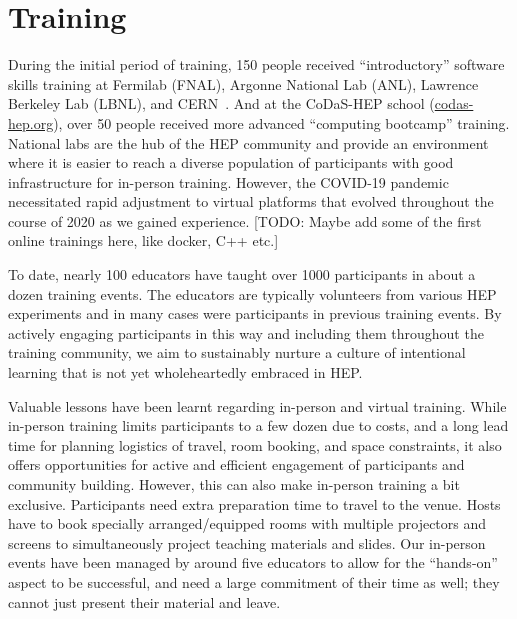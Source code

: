 \documentclass[twocolumn]{svjour3}          %
\begin{document}
\section{Training}\label{sec:Training}

During the initial period of training, 150 people received \enquote{introductory} software skills training at Fermilab (FNAL), Argonne National Lab (ANL), Lawrence Berkeley Lab (LBNL), and CERN~\cite{HSF-training-SC-FNAL-2019,HSF-training-ATLAS-ANL-2019,HSF-training-ATLAS-LBNL-2019,HSF-training-SC-CERN-2019}. And at the CoDaS-HEP school (\href{http://codas-hep.org/}{codas-hep.org}), over 50 people received more advanced ``computing bootcamp'' training. National labs are the hub of the HEP community and provide an environment where it is easier to reach a diverse population of participants with good infrastructure for in-person training.  However, the COVID-19 pandemic necessitated rapid adjustment to virtual platforms that evolved throughout the course of 2020 as we gained experience. [TODO: Maybe add some of the first online trainings here, like docker, C++ etc.] 

To date, nearly 100 educators have taught over 1000 participants in about a dozen training events. The educators are typically volunteers from various HEP experiments and in many cases were participants in previous training events.  By actively engaging participants in this way and including them throughout the training community, we aim to sustainably nurture a culture of intentional learning that is not yet wholeheartedly embraced in HEP. 

Valuable lessons have been learnt regarding in-person and virtual training. While in-person training limits participants to a few dozen due to costs, and a long lead time for planning logistics of travel, room booking, and space constraints, it also offers opportunities for active and efficient engagement of participants and community building. However, this can also make in-person training a bit exclusive. Participants need extra preparation time to travel to the venue. Hosts have to book specially arranged/equipped rooms with multiple projectors and screens to simultaneously project teaching materials and slides. Our in-person events have been managed by around five educators to allow for the ``hands-on'' aspect to be successful, and need a large commitment of their time as well; they cannot just present their material and leave.
\end{document}
